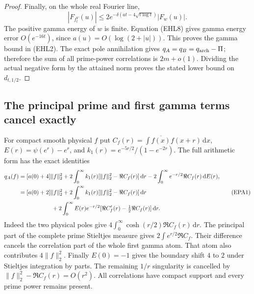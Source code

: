\documentclass[11pt]{article}
\theoremstyle{remark}\newtheorem{remark}[theorem]{Remark}
\newcommand{\dd}{\,\mathrm d}
\begin{document}
\begin{proof}
Finally, on the whole real Fourier line,
\[
 |F_{f_t^V}(u)|
 \le2e^{-\delta(at-4\sqrt{t\log t})}|F_w(u)|.              \tag{EHL9}
\]
The positive gamma energy of $w$ is finite.
Equation (EHL8) gives gamma energy error $O(e^{-16t})$,
since $a(u)=O(\log(2+|u|))$.
This proves the gamma bound in (EHL2).
The exact pole annihilation gives
$q_A=q_B=q_{\rm arch}-\Pi$; therefore the sum of
all prime-power correlations is $2m+o(1)$.
Dividing the actual negative form by the attained norm
proves the stated lower bound on $d_{t,1/2}$.
\end{proof}

\subsection{The principal prime and first gamma terms cancel exactly}
For compact smooth physical $f$ put
$C_f(r)=\int\overline{f(x)}f(x+r)\dd x$,
$E(r)=\psi(e^r)-e^r$, and
$k_1(r)=e^{-5r/2}/(1-e^{-2r})$.
The full arithmetic form has the exact identities
\[
 \begin{split}
 q_A(f)={}&[a(0)+4]\|f\|_2^2+
       2\int_0^\infty k_1(r)[\|f\|_2^2-\Re C_f(r)]\dd r
       -2\int_0^\infty e^{-r/2}\Re C_f(r)\dd E(r),\\
 ={}&[a(0)+2]\|f\|_2^2+
       2\int_0^\infty k_1(r)[\|f\|_2^2-\Re C_f(r)]\dd r\\
 &\hspace{15mm}
       +2\int_0^\infty E(r)e^{-r/2}
                    [\Re C_f'(r)-\tfrac12\Re C_f(r)]\dd r .
 \end{split}                                            \tag{EPA1}
\]
Indeed the two physical poles give
$4\int_0^\infty\cosh(r/2)\Re C_f(r)\dd r$.
The principal part of the complete prime Stieltjes measure
gives $2\int e^{r/2}\Re C_f$. Their difference cancels
the correlation part of the whole first gamma atom.
That atom also contributes $4\|f\|_2^2$.
Finally $E(0)=-1$ gives the boundary shift $4$ to $2$
under Stieltjes integration by parts.
The remaining $1/r$ singularity is cancelled by
$\|f\|_2^2-\Re C_f(r)=O(r^2)$. All correlations have
compact support and every prime power remains present.
\end{document}
